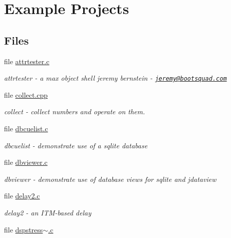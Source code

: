 \hypertarget{group__examples}{
\section{Example Projects}
\label{group__examples}
}
\subsection*{Files}
\begin{DoxyCompactItemize}
\item 
file \hyperlink{attrtester_8c}{attrtester.c}


\begin{DoxyCompactList}\small\item\em attrtester -\/ a max object shell jeremy bernstein -\/ \href{mailto:jeremy@bootsquad.com}{\tt jeremy@bootsquad.com} \item\end{DoxyCompactList}\item 
file \hyperlink{collect_8cpp}{collect.cpp}


\begin{DoxyCompactList}\small\item\em collect -\/ collect numbers and operate on them. \item\end{DoxyCompactList}\item 
file \hyperlink{dbcuelist_8c}{dbcuelist.c}


\begin{DoxyCompactList}\small\item\em dbcuelist -\/ demonstrate use of a sqlite database \item\end{DoxyCompactList}\item 
file \hyperlink{dbviewer_8c}{dbviewer.c}


\begin{DoxyCompactList}\small\item\em dbviewer -\/ demonstrate use of database views for sqlite and jdataview \item\end{DoxyCompactList}\item 
file \hyperlink{delay2_8c}{delay2.c}


\begin{DoxyCompactList}\small\item\em delay2 -\/ an ITM-\/based delay \item\end{DoxyCompactList}\item 
file \hyperlink{dspstress~_8c}{dspstress$\sim$.c}



\end{DoxyCompactItemize}
